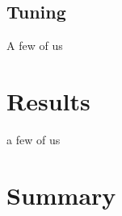 \documentclass[twoside,11pt]{article}
\begin{document}
\subsection{Tuning}

A few of us

\section{Results}

a few of us

\section{Summary}




\end{document}

